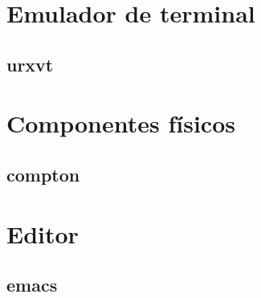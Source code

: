 \documentclass[a4paper, 11pt, titlepage]{book}
\begin{document}
    \section{Emulador de terminal}

        \subsection{urxvt}

    \section{Componentes físicos}

        \subsection{compton}

    \section{Editor}

        \subsection{emacs}
\end{document}
